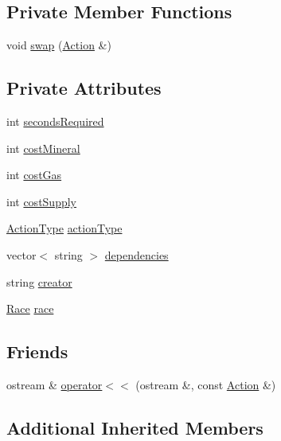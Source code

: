 \subsection*{Private Member Functions}
\begin{DoxyCompactItemize}
\item 
void \hyperlink{classghost_1_1Action_a8c965c1de8861fd2fd49cec707d94be0}{swap} (\hyperlink{classghost_1_1Action}{Action} \&)
\end{DoxyCompactItemize}
\subsection*{Private Attributes}
\begin{DoxyCompactItemize}
\item 
int \hyperlink{classghost_1_1Action_a18e79ee3f861c807dfd8c1b35c2b7a3f}{seconds\-Required}
\item 
int \hyperlink{classghost_1_1Action_abc5c6f31a411189a0dbd57a42e20c723}{cost\-Mineral}
\item 
int \hyperlink{classghost_1_1Action_a19015ea4ddcabea95f610b1a5450b3a0}{cost\-Gas}
\item 
int \hyperlink{classghost_1_1Action_ac804f6d585c2b9df3bc9809539f72db3}{cost\-Supply}
\item 
\hyperlink{namespaceghost_a7c0deb8266504feb7d025903f2b77693}{Action\-Type} \hyperlink{classghost_1_1Action_ab4a95e2a3030b8d81ae5da00f11c6118}{action\-Type}
\item 
vector$<$ string $>$ \hyperlink{classghost_1_1Action_a0e7e5f84cc8d24bed8d83021602b02c2}{dependencies}
\item 
string \hyperlink{classghost_1_1Action_ab4862cbb4a415783306abbd1a2c57472}{creator}
\item 
\hyperlink{namespaceghost_a8b1db75c40c6980adcf244ddccc0324b}{Race} \hyperlink{classghost_1_1Action_a040eaa1d69dc99221cbdf48d84ce6edb}{race}
\end{DoxyCompactItemize}
\subsection*{Friends}
\begin{DoxyCompactItemize}
\item 
ostream \& \hyperlink{classghost_1_1Action_a44b75b6ed85320c12cd00afe16e9872d}{operator$<$$<$} (ostream \&, const \hyperlink{classghost_1_1Action}{Action} \&)
\end{DoxyCompactItemize}
\subsection*{Additional Inherited Members}


